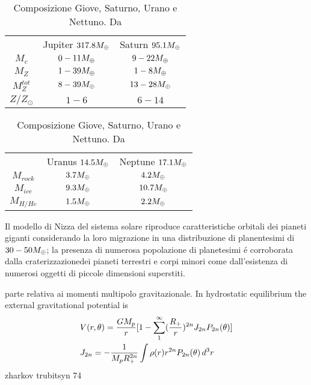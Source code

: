 \begin{table}[!htb]
    \begin{minipage}{.5\linewidth}
      \centering
        \begin{tabular}{ccc}
&\parbox{1.5cm}{Jupiter $317.8M_{\oplus}{}$}&\parbox{1.5cm}{Saturn $95.1M_{\oplus}{}$}\\
  $M_c$&$0-11M_{\oplus}{}$&$9-22M_{\oplus}{}$\\
$M_Z$&$1-39M_{\oplus}{}$&$1-8M_{\oplus}{}$\\
$M_Z^{tot}$&$8-39M_{\oplus}{}$&$13-28M_{\oplus}{}$\\
$Z/Z_{\odot}$&$1-6$&$6-14$\\
 \end{tabular}
    \end{minipage}%
    \begin{minipage}{.5\linewidth}
      \centering
        \begin{tabular}{ccc}
&\parbox{1.5cm}{Uranus $14.5M_{\oplus}{}$}&\parbox{1.5cm}{Neptune $17.1M_{\oplus}{}$}\\
$M_{rock}$&$3.7M_{\oplus}{}$&$4.2M_{\oplus}{}$\\
$M_{ice}$&$9.3M_{\oplus}{}$&$10.7M_{\oplus}{}$\\
$M_{H/He}$&$1.5M_{\oplus}{}$&$2.2M_{\oplus}{}$\\
        \end{tabular}
    \end{minipage} 
    \caption{Composizione Giove, Saturno, Urano e Nettuno. Da \cite{baraffe2009physical}}\label{tab:JSUNcomp}
\end{table}

Il modello di Nizza del sistema solare riproduce caratteristiche orbitali dei pianeti giganti considerando la loro migrazione in una distribuzione di planentesimi di $30-50M_{\oplus}{}$; la presenza di numerosa popolazione di planetesimi \'e corroborata dalla craterizzazionedei pianeti terrestri e corpi minori come dall'esistenza di numerosi oggetti di piccole dimensioni superstiti.

\begin{workout}
parte relativa ai momenti multipolo gravitazionale. 
In hydrostatic equilibrium the external gravitational potential is
\begin{align}
&V(r,\theta)=\frac{GM_p}{r}[1-\sum_1^{\infty}(\frac{R_+}{r})^{2n}J_{2n}P_{2n}(\theta)]\\
&J_{2n}=-\frac{1}{M_pR_+^{2n}}\int\rho(r) r^{2n}P_{2n}(\theta)\,d^3r
\end{align}
zharkov trubitsyn 74
\end{workout}

